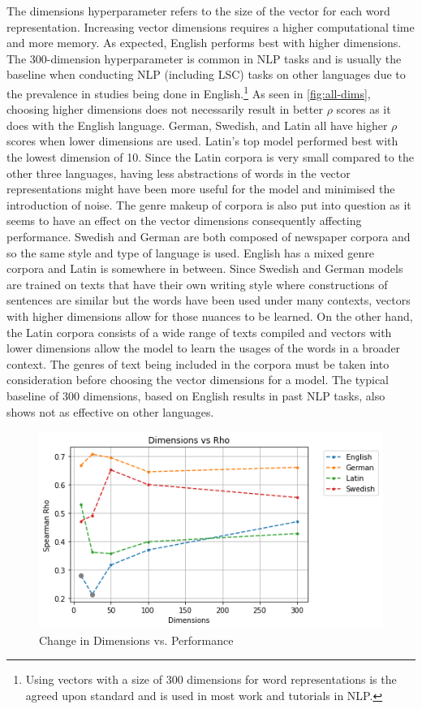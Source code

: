 The dimensions hyperparameter refers to the size of the vector for each word representation. Increasing vector dimensions requires a higher computational time and more memory. As expected, English performs best with higher dimensions. The 300-dimension hyperparameter is common in NLP tasks and is usually the baseline when conducting NLP (including LSC) tasks on other languages due to the prevalence in studies being done in English.\footnote{Using vectors with a size of 300 dimensions for word representations is the agreed upon standard and is used in most work and tutorials in NLP.} As seen in \autoref{fig:all-dims}, choosing higher dimensions does not necessarily result in better $\rho$ scores as it does with the English language. German, Swedish, and Latin all have higher $\rho$ scores when lower dimensions are used. Latin’s top model performed best with the lowest dimension of 10. Since the Latin corpora is very small compared to the other three languages, having less abstractions of words in the vector representations might have been more useful for the model and minimised the introduction of noise. The genre makeup of corpora is also put into question as it seems to have an effect on the vector dimensions consequently affecting performance. Swedish and German are both composed of newspaper corpora and so the same style and type of language is used. English has a mixed genre corpora and Latin is somewhere in between. Since Swedish and German models are trained on texts that have their own writing style where constructions of sentences are similar but the words have been used under many contexts, vectors with higher dimensions allow for those nuances to be learned. On the other hand, the Latin corpora consists of a wide range of texts compiled and vectors with lower dimensions allow the model to learn the usages of the words in a broader context. The genres of text being included in the corpora must be taken into consideration before choosing the vector dimensions for a model. The typical baseline of 300 dimensions, based on English results in past NLP tasks, also shows not as effective on other languages.


\begin{figure}[h]
  \centering
  \includegraphics[width=.8\linewidth]{sections/figures/dims_all.png}
  \caption{Change in Dimensions vs. Performance}
  \label{fig:all-dims}
\end{figure}

